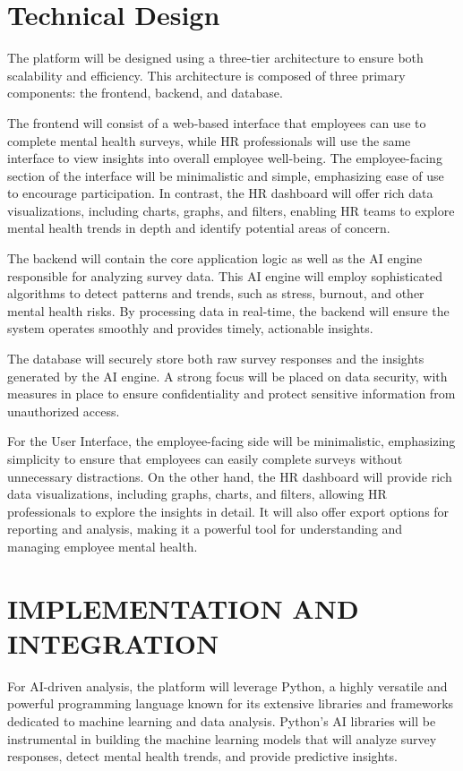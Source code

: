 \documentclass[conference]{IEEEtran}
\begin{document}
\section{Technical Design}
The platform will be designed using a three-tier
architecture to ensure both scalability and efficiency. This
architecture is composed of three primary components: the
frontend, backend, and database.\newline

The frontend will consist of a web-based interface that
employees can use to complete mental health surveys, while
HR professionals will use the same interface to view insights
into overall employee well-being. The employee-facing
section of the interface will be minimalistic and simple,
emphasizing ease of use to encourage participation. In
contrast, the HR dashboard will offer rich data visualizations,
including charts, graphs, and filters, enabling HR teams to
explore mental health trends in depth and identify potential
areas of concern.\newline

The backend will contain the core application logic as well
as the AI engine responsible for analyzing survey data. This
AI engine will employ sophisticated algorithms to detect
patterns and trends, such as stress, burnout, and other mental
health risks. By processing data in real-time, the backend will
ensure the system operates smoothly and provides timely,
actionable insights.\newline

The database will securely store both raw survey responses
and the insights generated by the AI engine. A strong focus
will be placed on data security, with measures in place to
ensure confidentiality and protect sensitive information from
unauthorized access.\newline

For the User Interface, the employee-facing side will be
minimalistic, emphasizing simplicity to ensure that employees
can easily complete surveys without unnecessary distractions.
On the other hand, the HR dashboard will provide rich data
visualizations, including graphs, charts, and filters, allowing
HR professionals to explore the insights in detail. It will also
offer export options for reporting and analysis, making it a
powerful tool for understanding and managing employee
mental health.


\section{IMPLEMENTATION AND INTEGRATION}
For AI-driven analysis, the platform will leverage
Python, a highly versatile and powerful programming
language known for its extensive libraries and frameworks
dedicated to machine learning and data analysis. Python’s AI
libraries will be instrumental in building the machine
learning models that will analyze survey responses, detect
mental health trends, and provide predictive insights.
\newline
\end{document}
